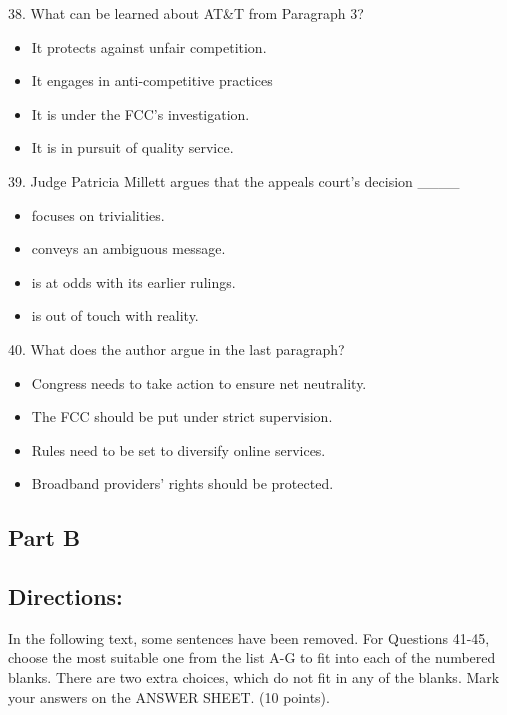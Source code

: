 \documentclass[UTF8,11pt]{ctexart}
\begin{document}
38. What can be learned about AT\&T from Paragraph 3?


\begin{itemize}[leftmargin=2em,itemsep=.2em,topsep=.4em]\item[A.] It protects against unfair competition.
\item[B.] It engages in anti-competitive practices
\item[C.] It is under the FCC’s investigation.
\item[D.] It is in pursuit of quality service.
\end{itemize}

39. Judge Patricia Millett argues that the appeals court’s decision \_\_\_\_


\begin{itemize}[leftmargin=2em,itemsep=.2em,topsep=.4em]\item[A.] focuses on trivialities.
\item[B.] conveys an ambiguous message.
\item[C.] is at odds with its earlier rulings.
\item[D.] is out of touch with reality.
\end{itemize}

40. What does the author argue in the last paragraph?


\begin{itemize}[leftmargin=2em,itemsep=.2em,topsep=.4em]\item[A.] Congress needs to take action to ensure net neutrality.
\item[B.] The FCC should be put under strict supervision.
\item[C.] Rules need to be set to diversify online services.
\item[D.] Broadband providers’ rights should be protected.
\end{itemize}

\subsection*{\textbf{Part B}}


\subsection*{\textbf{Directions:}}


In the following text, some sentences have been removed. For Questions 41-45, choose the most suitable one from the list A-G to fit into each of the numbered blanks. There are two extra choices, which do not fit in any of the blanks. Mark your answers on the ANSWER SHEET. (10 points).
\end{document}
